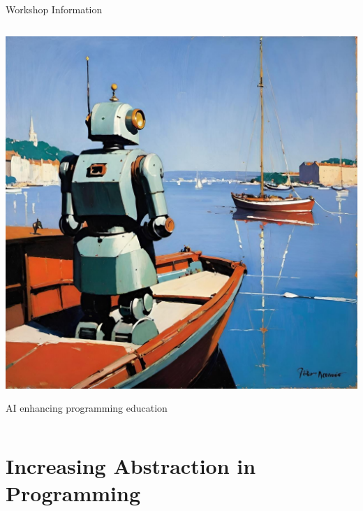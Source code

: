 \documentclass[xcolor=dvipsnames, aspectratio=169]{beamer}
\begin{document}
\begin{frame}{Workshop Information}
\begin{columns}
    \begin{column}{0.38\textwidth}
      \includegraphics[width=\textwidth]{images/ai_programming.jpeg}
      \vspace{0.2cm}
      \small\centerline{AI enhancing programming education}
    \end{column}
  \end{columns}
\end{frame}

\section{Increasing Abstraction in Programming}
\end{document}
